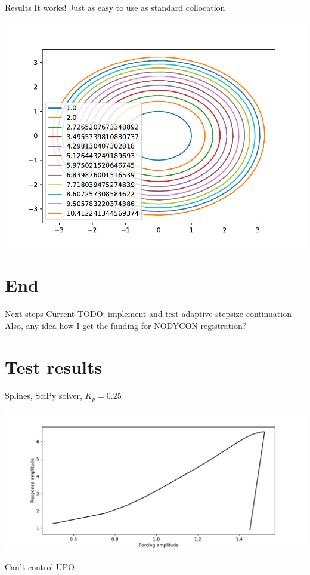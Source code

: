 \documentclass[presentation]{beamer}
\begin{document}
\begin{frame}[label={sec:orgbddb6cf},plain]{Results}
\vfill 
It works! Just as easy to use as standard collocation

\begin{center}
\includegraphics[width=.9\linewidth]{./BSpline_continuation.pdf}
\end{center}
\end{frame}
\section{End}
\label{sec:org2fedddc}
\begin{frame}[label={sec:org2a951e5}]{Next steps}
Current TODO: implement and test adaptive stepsize continuation
\vfill
Also, any idea how I get the funding for NODYCON registration?
\end{frame}

\section{Test results}
\label{sec:orgd144d80}
\begin{frame}[label={sec:org284d33a}]{Splines, SciPy solver, \(K_p=0.25\)}
\begin{center}
\includegraphics[width=.9\linewidth]{./kp0d25_transtime100_scipy.pdf}
\end{center}

Can't control UPO
\end{frame}
\end{document}
